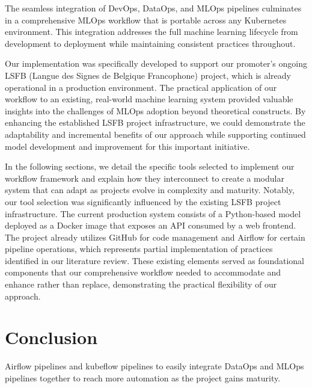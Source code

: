 The seamless integration of DevOps, DataOps, and MLOps pipelines culminates in a comprehensive MLOps workflow that is portable across any Kubernetes environment.
This integration addresses the full machine learning lifecycle from development to deployment while maintaining consistent practices throughout.

Our implementation was specifically developed to support our promoter's ongoing LSFB (Langue des Signes de Belgique Francophone) project, which is already operational in a production environment.
The practical application of our workflow to an existing, real-world machine learning system provided valuable insights into the challenges of MLOps adoption beyond theoretical constructs.
By enhancing the established LSFB project infrastructure, we could demonstrate the adaptability and incremental benefits of our approach while supporting continued model development and improvement for this important initiative.

In the following sections, we detail the specific tools selected to implement our workflow framework and explain how they interconnect to create a modular system that can adapt as projects evolve in complexity and maturity.
Notably, our tool selection was significantly influenced by the existing LSFB project infrastructure.
The current production system consists of a Python-based model deployed as a Docker image that exposes an API consumed by a web frontend.
The project already utilizes GitHub for code management and Airflow for certain pipeline operations, which represents partial implementation of practices identified in our literature review.
These existing elements served as foundational components that our comprehensive workflow needed to accommodate and enhance rather than replace, demonstrating the practical flexibility of our approach.








\section{Conclusion}\label{sec:conclusion}
Airflow pipelines and kubeflow pipelines to easily integrate DataOps and MLOps pipelines together to reach more automation as the project gains maturity.
